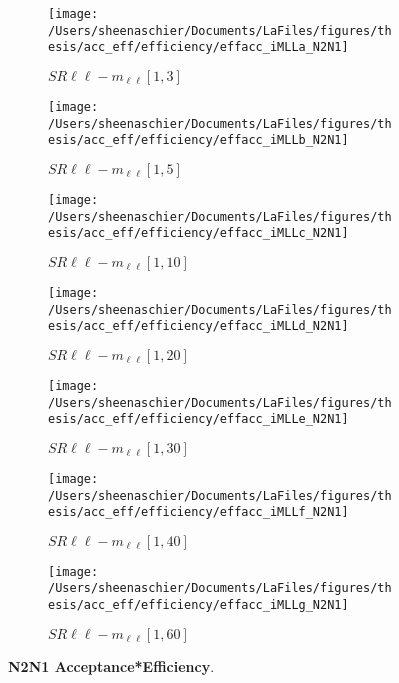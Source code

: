 \begin{figure}
        \centering
    \begin{subfigure}[b]{0.44\textwidth}
        \texttt{[image: /Users/sheenaschier/Documents/LaFiles/figures/thesis/acc\_eff/efficiency/effacc\_iMLLa\_N2N1]}
    \caption{$SR\ell\ell-m_{\ell\ell} [1, 3]$}
    \end{subfigure}
    \begin{subfigure}[b]{0.44\textwidth}
        \texttt{[image: /Users/sheenaschier/Documents/LaFiles/figures/thesis/acc\_eff/efficiency/effacc\_iMLLb\_N2N1]}
    \caption{$SR\ell\ell-m_{\ell\ell} [1, 5]$}
    \end{subfigure}
    \begin{subfigure}[b]{0.44\textwidth}
        \texttt{[image: /Users/sheenaschier/Documents/LaFiles/figures/thesis/acc\_eff/efficiency/effacc\_iMLLc\_N2N1]}
    \caption{$SR\ell\ell-m_{\ell\ell} [1, 10]$}
    \end{subfigure}
    \begin{subfigure}[b]{0.44\textwidth}
        \texttt{[image: /Users/sheenaschier/Documents/LaFiles/figures/thesis/acc\_eff/efficiency/effacc\_iMLLd\_N2N1]}
    \caption{$SR\ell\ell-m_{\ell\ell} [1, 20]$}
    \end{subfigure}
    \begin{subfigure}[b]{0.44\textwidth}
        \texttt{[image: /Users/sheenaschier/Documents/LaFiles/figures/thesis/acc\_eff/efficiency/effacc\_iMLLe\_N2N1]}
    \caption{$SR\ell\ell-m_{\ell\ell} [1, 30]$}
    \end{subfigure}
    \begin{subfigure}[b]{0.44\textwidth}
        \texttt{[image: /Users/sheenaschier/Documents/LaFiles/figures/thesis/acc\_eff/efficiency/effacc\_iMLLf\_N2N1]}
    \caption{$SR\ell\ell-m_{\ell\ell} [1, 40]$}
    \end{subfigure}
    \begin{subfigure}[b]{0.44\textwidth}
        \texttt{[image: /Users/sheenaschier/Documents/LaFiles/figures/thesis/acc\_eff/efficiency/effacc\_iMLLg\_N2N1]}
    \caption{$SR\ell\ell-m_{\ell\ell} [1, 60]$}
    \end{subfigure}
    \caption{\textbf{N2N1 Acceptance*Efficiency}.}
\end{figure}

